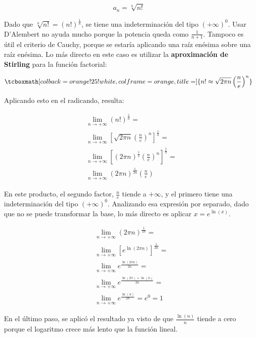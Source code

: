 \documentclass{article}
\newcommand{\hresult}[2]{\tcboxmath[colback=orange!25!white,colframe=orange, title=#1] {#2} }
\newcommand{\limninf}{\lim_{n \rightarrow +\infty}}
\begin{document}
\begin{equation}
a_n = \sqrt[n]{n!}
\end{equation}

Dado que $ \sqrt[n]{n!} = (n!)^{ \frac{1}{n} } $, se tiene una indeterminación del tipo $ (+\infty)^0 $. Usar D'Alembert no ayuda mucho porque la potencia queda como $ \frac{1}{n+1} $. Tampoco es útil el criterio de Cauchy, porque se estaría aplicando una raíz enésima sobre una raíz enésima. Lo más directo en este caso es utilizar la \textbf{aproximación de Stirling} para la función factorial:

\begin{equation}
\hresult{}{n! \approx \sqrt{2 \pi n} \left( \frac{n}{e} \right)^n}
\end{equation}

Aplicando esto en el radicando, resulta:

\begin{subequations}
\begin{align}
& \limninf (n!)^{ \frac{1}{n} } = \\
& \limninf \left[ \sqrt{2 \pi n} \left( \frac{n}{e} \right)^n \right]^{ \frac{1}{n} } = \\
& \limninf \left[ (2 \pi n)^{\frac{1}{2}} \left( \frac{n}{e} \right)^n \right]^{ \frac{1}{n} } = \\
& \limninf (2 \pi n)^{\frac{1}{2n}} \left( \frac{n}{e} \right)
\end{align}
\end{subequations}

En este producto, el segundo factor, $ \frac{n}{e} $ tiende a $ +\infty $, y el primero tiene una indeterminación del tipo $ (+\infty)^0 $. Analizando esa expresión por separado, dado que no se puede transformar la base, lo más directo es aplicar $ x = e^{\ln(x)} $.

\begin{subequations}
\begin{align}
& \limninf (2 \pi n)^{ \frac{1}{2n} } = \\
& \limninf \left[ e^{ \ln(2 \pi n) } \right]^{ \frac{1}{2n} } = \\
& \limninf e^{ \frac{ \ln(2 \pi n) }{2n} } = \\
& \limninf e^{ \frac{ \ln(2 \pi) + \ln(n) }{2n} } = \\
& \limninf e^{ \frac{\ln(n)}{2n} } = e^0 = 1
\end{align}
\end{subequations}

En el último paso, se aplicó el resultado ya visto de que $ \frac{\ln(n)}{n} $ tiende a cero porque el logaritmo crece más lento que la función lineal.
\end{document}
